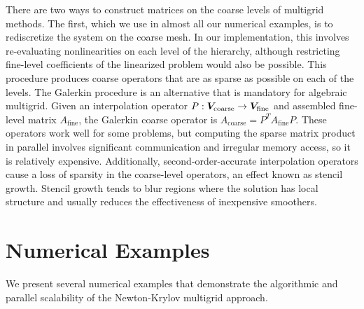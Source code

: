 There are two ways to construct matrices on the coarse levels of multigrid methods.
The first, which we use in almost all our numerical examples, is to rediscretize the system on the coarse mesh.
In our implementation, this involves re-evaluating nonlinearities on each level of the hierarchy, although restricting fine-level coefficients of the linearized problem would also be possible.
This procedure produces coarse operators that are as sparse as possible on each of the levels.
The Galerkin procedure is an alternative that is mandatory for algebraic multigrid.
Given an interpolation operator $P: \bm V_{\text{coarse}} \to \bm V_{\text{fine}}$ and assembled fine-level matrix $A_{\text{fine}}$, the Galerkin coarse operator is $A_{\text{coarse}} = P^T A_{\text{fine}} P$.
These operators work well for some problems, but computing the sparse matrix product in parallel involves significant communication and irregular memory access, so it is relatively expensive.
Additionally, second-order-accurate interpolation operators cause a loss of sparsity in the coarse-level operators, an effect known as stencil growth.
Stencil growth tends to blur regions where the solution has local structure and usually reduces the effectiveness of inexpensive smoothers.

\section{Numerical Examples}\label{sec:hstatexamples}

We present several numerical examples that demonstrate the algorithmic and parallel scalability of the Newton-Krylov multigrid approach.

